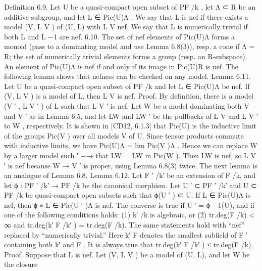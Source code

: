 \documentclass[
  10pt,
]{article}
\newenvironment{Shaded}{}{}
\newcommand{\NormalTok}[1]{#1}
\begin{document}
\begin{Shaded}
\begin{Highlighting}[]
\NormalTok{Definition 6.9. Let U be a quasi{-}compact open subset of PF /k , let Λ ⊂ R be an additive}
\NormalTok{subgroup, and let L ∈ Pic(U)Λ . We say that L is nef if there exists a model (V, L V ) of}
\NormalTok{(U, L) with L V nef. We say that L is numerically trivial if both L and L −1 are nef.}
\NormalTok{6.10. The set of nef elements of Pic(U)Λ forms a monoid (pass to a dominating model}
\NormalTok{and use Lemma 6.8(3)), resp. a cone if Λ = R; the set of numerically trivial elements}
\NormalTok{forms a group (resp. an R{-}subspace). An element of Pic(U)Λ is nef if and only if its image}
\NormalTok{in Pic(U)R is nef.}
\NormalTok{     The following lemma shows that nefness can be checked on any model.}
\NormalTok{Lemma 6.11. Let U be a quasi{-}compact open subset of PF /k and let L ∈ Pic(U)Λ be nef. If}
\NormalTok{(V, L V ) is a model of L, then L V is nef.}
\NormalTok{Proof. By definition, there is a model (V ′ , L V ′ ) of L such that L V ′ is nef. Let W be a model}
\NormalTok{dominating both V and V ′ as in Lemma 6.5, and let LW and LW         ′}
\NormalTok{                                                                        be the pullbacks of L V and}
\NormalTok{L V ′ to W , respectively. It is shown in [CD12, 6.1.3] that Pic(U) is the inductive limit of}
\NormalTok{the groups Pic(V ) over all models V of U. Since tensor products commute with inductive}
\NormalTok{limits, we have Pic(U)Λ = lim Pic(V )Λ . Hence we can replace W by a larger model such}
\NormalTok{               ′}
\NormalTok{                               −→}
\NormalTok{that LW = LW     in Pic(W ). Then LW is nef, so L V ′ is nef because W → V ′ is proper, using}
\NormalTok{Lemma 6.8(3) twice.                                                                               }
\NormalTok{     The next lemma is an analogue of Lemma 6.8.}
\NormalTok{Lemma 6.12. Let F ′ /k′ be an extension of F /k, and let ϕ : PF ′ /k′ → PF /k be the canonical}
\NormalTok{morphism. Let U ′ ⊂ PF ′ /k′ and U ⊂ PF /k be quasi{-}compact open subsets such that ϕ(U ′ ) ⊂ U.}
\NormalTok{If L ∈ Pic(U)Λ is nef, then ϕ ∗ L ∈ Pic(U ′ )Λ is nef. The converse is true if U ′ = ϕ −1(U), and}
\NormalTok{if one of the following conditions holds:}
\NormalTok{    (1) k′ /k is algebraic, or}
\NormalTok{    (2) tr.deg(F /k) \textless{} ∞ and tr.deg(k′ F /k′ ) = tr.deg(F /k).}
\NormalTok{The same statements hold with “nef” replaced by “numerically trivial.”}
\NormalTok{  Here k′ F denotes the smallest subfield of F ′ containing both k′ and F . It is always true}
\NormalTok{that tr.deg(k′ F /k′ ) ≤ tr.deg(F /k).}
\NormalTok{Proof. Suppose that L is nef. Let (V, L V ) be a model of (U, L), and let W be the closure}

\end{Highlighting}
\end{Shaded}
\end{document}
